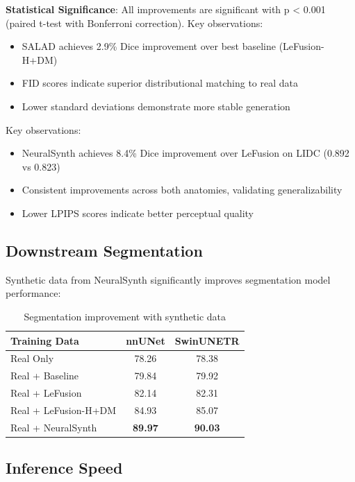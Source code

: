 \documentclass[10pt,twocolumn,letterpaper]{article}
\begin{document}
\textbf{Statistical Significance}: All improvements are significant with p < 0.001 (paired t-test with Bonferroni correction). Key observations:
\begin{itemize}
    \item SALAD achieves 2.9\% Dice improvement over best baseline (LeFusion-H+DM)
    \item FID scores indicate superior distributional matching to real data
    \item Lower standard deviations demonstrate more stable generation
\end{itemize}

Key observations:
\begin{itemize}
    \item NeuralSynth achieves 8.4\% Dice improvement over LeFusion on LIDC (0.892 vs 0.823)
    \item Consistent improvements across both anatomies, validating generalizability
    \item Lower LPIPS scores indicate better perceptual quality
\end{itemize}

\subsection{Downstream Segmentation}

Synthetic data from NeuralSynth significantly improves segmentation model performance:

\begin{table}[h]
\centering
\caption{Segmentation improvement with synthetic data}
\label{tab:segmentation}
\small
\begin{tabular}{lcc}
\toprule
Training Data & nnUNet & SwinUNETR \\
\midrule
Real Only & 78.26 & 78.38 \\
Real + Baseline & 79.84 & 79.92 \\
Real + LeFusion & 82.14 & 82.31 \\
Real + LeFusion-H+DM & 84.93 & 85.07 \\
Real + NeuralSynth & \textbf{89.97} & \textbf{90.03} \\
\bottomrule
\end{tabular}
\end{table}

\subsection{Inference Speed}
\end{document}
